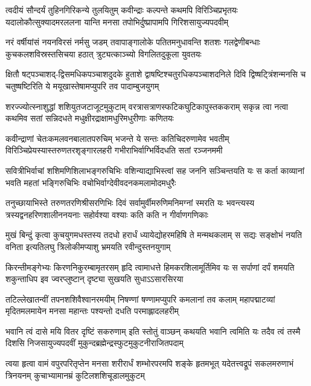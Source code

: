 \fourlineindentedshloka
{त्वदीयं सौन्दर्यं तुहिनगिरिकन्ये तुलयितुम्}
{कवीन्द्राः कल्पन्ते कथमपि विरिञ्चिप्रभृतयः}
{यदालोकौत्सुक्यादमरललना यान्ति मनसा}
{तपोभिर्दुष्प्रापामपि गिरिशसायुज्यपदवीम्}%

\fourlineindentedshloka
{नरं वर्षीयांसं नयनविरसं नर्मसु जडम्}
{तवापाङ्गालोके पतितमनुधावन्ति शतशः}
{गलद्वेणीबन्धाः कुचकलशविस्रस्तसिचया}
{हठात् त्रुट्यत्काञ्च्यो विगलितदुकूला युवतयः}%

\fourlineindentedshloka
{क्षितौ षट्पञ्चाशद्-द्विसमधिकपञ्चाशदुदके}
{हुताशे द्वाषष्टिश्चतुरधिकपञ्चाशदनिले}
{दिवि द्विष्षट्त्रिंशन्मनसि च चतुष्षष्टिरिति ये}
{मयूखास्तेषामप्युपरि तव पादाम्बुजयुगम्}%

\fourlineindentedshloka
{शरज्ज्योत्स्नाशुद्धां शशियुतजटाजूटमुकुटाम्}
{वरत्रासत्राणस्फटिकघुटिकापुस्तककराम्}
{सकृन्न त्वा नत्वा कथमिव सतां सन्निदधते}
{मधुक्षीरद्राक्षामधुरिमधुरीणाः कणितयः}%

\fourlineindentedshloka
{कवीन्द्राणां चेतःकमलवनबालातपरुचिम्}
{भजन्ते ये सन्तः कतिचिदरुणामेव भवतीम्}
{विरिञ्चिप्रेयस्यास्तरुणतरशृङ्गारलहरी}
{गभीराभिर्वाग्भिर्विदधति सतां रञ्जनममी}%

\fourlineindentedshloka
{सवित्रीभिर्वाचां शशिमणिशिलाभङ्गरुचिभिः}
{वशिन्याद्याभिस्त्वां सह जननि सञ्चिन्तयति यः}
{स कर्ता काव्यानां भवति महतां भङ्गिरुचिभिः}
{वचोभिर्वाग्देवीवदनकमलामोदमधुरैः}%

\fourlineindentedshloka
{तनुच्छायाभिस्ते तरुणतरणिश्रीसरणिभिः}
{दिवं सर्वामुर्वीमरुणिमनिमग्नां स्मरति यः}
{भवन्त्यस्य त्रस्यद्वनहरिणशालीननयनाः}
{सहोर्वश्या वश्याः कति कति न गीर्वाणगणिकाः}%

\fourlineindentedshloka
{मुखं बिन्दुं कृत्वा कुचयुगमधस्तस्य तदधो}
{हरार्धं ध्यायेद्योहरमहिषि ते मन्मथकलाम्}
{स सद्यः सङ्क्षोभं नयति वनिता इत्यतिलघु}
{त्रिलोकीमप्याशु भ्रमयति रवीन्दुस्तनयुगाम्}%

\fourlineindentedshloka
{किरन्तीमङ्गेभ्यः किरणनिकुरम्बामृतरसम्}
{हृदि त्वामाधत्ते हिमकरशिलामूर्तिमिव यः}
{स सर्पाणां दर्पं शमयति शकुन्ताधिप इव}
{ज्वरप्लुष्टान् दृष्ट्या सुखयति सुधाऽऽसारसिरया}%

\fourlineindentedshloka
{तटिल्लेखातन्वीं तपनशशिवैश्वानरमयीम्}
{निषण्णां षण्णामप्युपरि कमलानां तव कलाम्}
{महापद्माटव्यां मृदितमलमायेन मनसा}
{महान्तः पश्यन्तो दधति परमाह्लादलहरीम्}%

\fourlineindentedshloka
{भवानि त्वं दासे मयि वितर दृष्टिं सकरुणाम्}
{इति स्तोतुं वाञ्छन् कथयति भवानि त्वमिति यः}
{तदैव त्वं तस्मै दिशसि निजसायुज्यपदवीं}
{मुकुन्दब्रह्मेन्द्रस्फुटमुकुटनीराजितपदाम्}%

\fourlineindentedshloka
{त्वया हृत्वा वामं वपुरपरितृप्तेन मनसा}
{शरीरार्धं शम्भोरपरमपि शङ्के हृतमभूत्}
{यदेतत्त्वद्रूपं सकलमरुणाभं त्रिनयनम्}
{कुचाभ्यामानम्रं कुटिलशशिचूडालमुकुटम्}%

